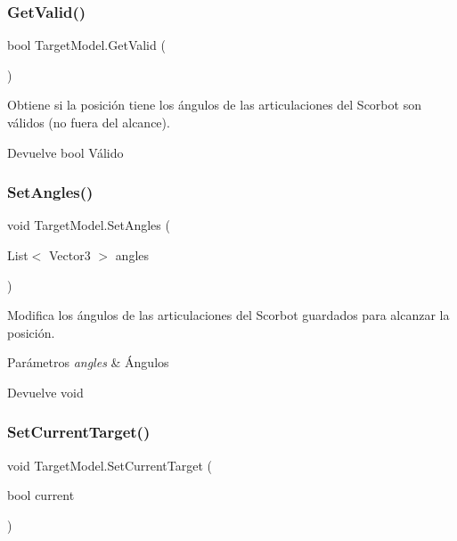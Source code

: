 \subsubsection{\texorpdfstring{GetValid()}{GetValid()}}
{\footnotesize\ttfamily bool Target\+Model.\+Get\+Valid (\begin{DoxyParamCaption}{ }\end{DoxyParamCaption})\hspace{0.3cm}{\ttfamily [inline]}}

Obtiene si la posición tiene los ángulos de las articulaciones del Scorbot son válidos (no fuera del alcance). \begin{DoxyReturn}{Devuelve}
bool Válido 
\end{DoxyReturn}
\mbox{\label{class_target_model_a36babf52c1f4e545e7db883cb66fbce5}} 
\subsubsection{\texorpdfstring{SetAngles()}{SetAngles()}}
{\footnotesize\ttfamily void Target\+Model.\+Set\+Angles (\begin{DoxyParamCaption}\item[{List$<$ Vector3 $>$}]{angles }\end{DoxyParamCaption})\hspace{0.3cm}{\ttfamily [inline]}}

Modifica los ángulos de las articulaciones del Scorbot guardados para alcanzar la posición. 
\begin{DoxyParams}{Parámetros}
{\em angles} & Ángulos \\
\hline
\end{DoxyParams}
\begin{DoxyReturn}{Devuelve}
void 
\end{DoxyReturn}
\mbox{\label{class_target_model_a1f82c9cde211b28154e072c7873994d9}} 
\subsubsection{\texorpdfstring{SetCurrentTarget()}{SetCurrentTarget()}}
{\footnotesize\ttfamily void Target\+Model.\+Set\+Current\+Target (\begin{DoxyParamCaption}\item[{bool}]{current }\end{DoxyParamCaption})\hspace{0.3cm}{\ttfamily [inline]}}

